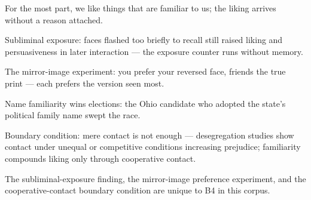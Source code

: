 

\begin{distilled}
  \item For the most part, we like things that are familiar to us; the liking arrives without a reason attached.
  \item Subliminal exposure: faces flashed too briefly to recall still raised liking and persuasiveness in later interaction --- the exposure counter runs without memory.
  \item The mirror-image experiment: you prefer your reversed face, friends the true print --- each prefers the version seen most.
  \item Name familiarity wins elections: the Ohio candidate who adopted the state's political family name swept the race.
  \item Boundary condition: mere contact is not enough --- desegregation studies show contact under unequal or competitive conditions increasing prejudice; familiarity compounds liking only through cooperative contact.
\end{distilled}
\begin{unique}
  \item The subliminal-exposure finding, the mirror-image preference experiment, and the cooperative-contact boundary condition are unique to B4 in this corpus.
\end{unique}

